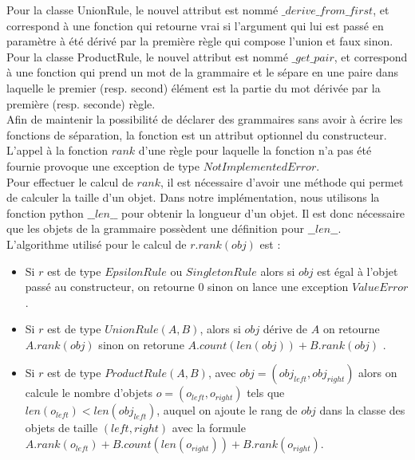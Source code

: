 \documentclass[a4paper, titlepage]{article}
\begin{document}
Pour la classe UnionRule, le nouvel attribut est nommé
$\_derive\_from\_first$, et correspond à une fonction qui retourne
vrai si l'argument qui lui est passé en paramètre à été dérivé par la
première règle qui compose l'union et faux sinon.\\


Pour la classe ProductRule, le nouvel attribut est nommé
$\_get\_pair$, et correspond à une fonction qui prend un mot de la
grammaire et le sépare en une paire dans laquelle le premier (resp. second) élément
est la partie du mot dérivée par la première (resp. seconde) règle.\\


Afin de maintenir la possibilité de déclarer des grammaires sans avoir
à écrire les fonctions de séparation, la fonction est un attribut
optionnel du constructeur. L'appel à la fonction $rank$ d'une règle
pour laquelle la fonction n'a pas été fournie provoque une exception
de type $NotImplementedError$. \\

Pour effectuer le calcul de $rank$, il est nécessaire d'avoir une
méthode qui permet de calculer la taille d'un objet. Dans notre
implémentation, nous utilisons la fonction python $\_\_len\_\_$ pour
obtenir la longueur d'un objet. Il est donc nécessaire que les objets
de la grammaire possèdent une définition pour $\_\_len\_\_$.\\

L'algorithme utilisé pour le calcul de $r.rank(obj)$ est :\\

\begin{itemize}
  
\item Si $r$ est de type $EpsilonRule$ ou $SingletonRule$ alors si
  $obj$ est égal à l'objet passé au constructeur, on retourne 0 sinon on
  lance une exception $ValueError$.\\

\item Si $r$ est de type $UnionRule(A, B)$, alors si $obj$ dérive de
  $A$ on retourne $A.rank(obj)$ sinon on retorune $A.count(len(obj)) +
  B.rank(obj)$ .\\

\item Si $r$ est de type $ProductRule(A, B)$, avec $obj = (obj_{left},
  obj_{right})$ alors on calcule le nombre d'objets $o =
  (o_{left}, o_{right})$ tels que $len(o_{left}) < len(obj_{left})$,
  auquel on ajoute le rang de $obj$ dans la classe des objets de
  taille $(left, right)$ avec la formule $A.rank(o_{left}) +
  B.count(len(o_{right})) + B.rank(o_{right})$.\\
  
\end{itemize}
\end{document}
